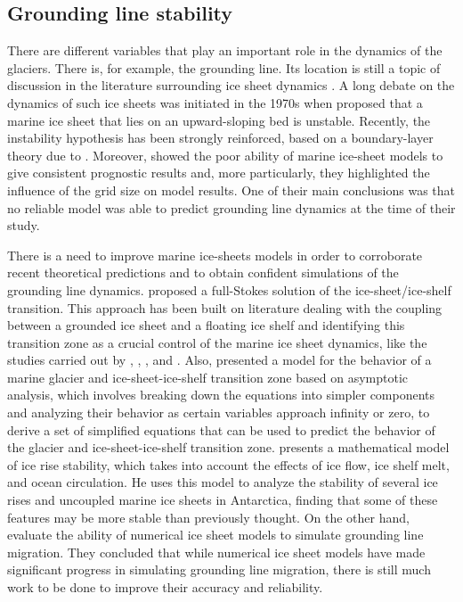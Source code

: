 \documentclass{article}
\begin{document}
\subsection{Grounding line stability}

There are different variables that play an important role in the dynamics of the glaciers. There is, for example, the grounding line. Its location is still a topic of discussion in the literature surrounding ice sheet dynamics \cite{goldberg2018representing}. A long debate on the dynamics of such ice sheets was initiated in the 1970s when \cite{weertman1974stability} proposed that a marine ice sheet that lies on an upward-sloping bed is unstable. Recently, the instability hypothesis has been strongly reinforced, based on a boundary-layer theory due to \cite{schoof2007ice}. Moreover, \cite{vieli2005assessing} showed the poor ability of marine ice-sheet models to give consistent prognostic results and, more particularly, they highlighted the influence of the grid size on model results. One of their main conclusions was that no reliable model was able to predict grounding line dynamics at the time of their study.

There is a need to improve marine ice-sheets models in order to corroborate recent theoretical predictions and to obtain confident simulations of the grounding line dynamics. \cite{durand2009marine} proposed a full-Stokes solution of the ice-sheet/ice-shelf transition. This approach has been built on literature dealing with the coupling between a grounded ice sheet and a floating ice shelf and identifying this transition zone as a crucial control of the marine ice sheet dynamics, like the studies carried out by \cite{weertman1974stability}, \cite{van1985response}, \cite{schoof2007ice}, and \cite{schoof2007marine}. Also, \cite{chugunov1996modelling} presented a model for the behavior of a marine glacier and ice-sheet-ice-shelf transition zone based on asymptotic analysis, which involves breaking down the equations into simpler components and analyzing their behavior as certain variables approach infinity or zero, to derive a set of simplified equations that can be used to predict the behavior of the glacier and ice-sheet-ice-shelf transition zone. \cite{hindmarsh1996stability} presents a mathematical model of ice rise stability, which takes into account the effects of ice flow, ice shelf melt, and ocean circulation. He uses this model to analyze the stability of several ice rises and uncoupled marine ice sheets in Antarctica, finding that some of these features may be more stable than previously thought. On the other hand, \cite{vieli2005assessing} evaluate the ability of numerical ice sheet models to simulate grounding line migration. They concluded that while numerical ice sheet models have made significant progress in simulating grounding line migration, there is still much work to be done to improve their accuracy and reliability.
\end{document}
